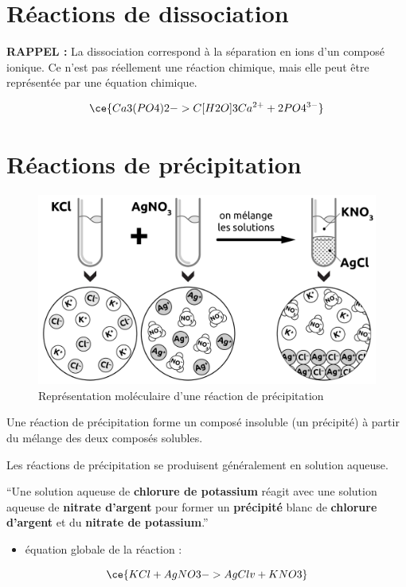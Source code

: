 \documentclass[
  11pt,
  a4paper,
  openany]{book}
\providecommand{\tightlist}{%
  \setlength{\itemsep}{0pt}\setlength{\parskip}{0pt}}
\begin{document}
\section{Réactions de dissociation}\label{ruxe9actions-de-dissociation}

\textbf{RAPPEL :} La dissociation correspond à la séparation en ions d'un composé ionique. Ce n'est pas réellement une réaction chimique, mais elle peut être représentée par une équation chimique.

\[ \ce{Ca3(PO4)2 ->C[H2O] 3Ca^{2+} + 2PO4^{3-}} \]

\section{Réactions de précipitation}\label{ruxe9actions-de-pruxe9cipitation}

\begin{figure}

{\centering \includegraphics[width=0.5\linewidth]{images/precipitation-0} 

}

\caption{Représentation moléculaire d'une réaction de précipitation}\label{fig:precipitation-0}
\end{figure}

Une réaction de précipitation forme un composé insoluble (un précipité) à partir du mélange des deux composés solubles.

Les réactions de précipitation se produisent généralement en solution aqueuse.

``Une solution aqueuse de \textbf{chlorure de potassium} réagit avec une solution aqueuse de \textbf{nitrate d'argent} pour former un \textbf{précipité} blanc de \textbf{chlorure d'argent} et du \textbf{nitrate de potassium}.''

\begin{itemize}
\tightlist
\item
  équation globale de la réaction :
\end{itemize}

\[ \ce{KCl + AgNO3 -> AgCl v + KNO3} \]
\end{document}
